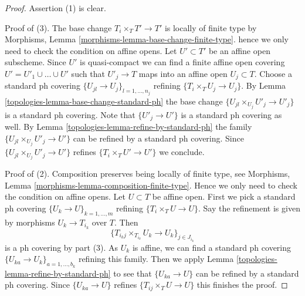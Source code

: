 \begin{proof}

Assertion (1) is clear.

\medskip\noindent
Proof of (3). The base change $T_i \times_T T' \to T'$ is
locally of finite type by
Morphisms, Lemma \ref{morphisms-lemma-base-change-finite-type}.
hence we only need to check the condition on affine opens.
Let $U' \subset T'$ be an affine open subscheme.
Since $U'$ is quasi-compact we can find a finite affine open
covering $U' = U'_1 \cup \ldots \cup U'$ such that
$U'_j \to T$ maps into an affine open $U_j \subset T$.
Choose a standard ph covering $\{U_{jl} \to U_j\}_{l = 1, \ldots, n_j}$
refining $\{T_i \times_T U_j \to U_j\}$.
By Lemma \ref{topologies-lemma-base-change-standard-ph}
the base change $\{U_{jl} \times_{U_j} U'_j \to U'_j\}$
is a standard ph covering. Note that $\{U'_j \to U'\}$
is a standard ph covering as well.
By Lemma \ref{topologies-lemma-refine-by-standard-ph}
the family $\{U_{jl} \times_{U_j} U'_j \to U'\}$
can be refined by a standard ph covering. Since
$\{U_{jl} \times_{U_j} U'_j \to U'\}$ refines $\{T_i \times_T U' \to U'\}$
we conclude.

\medskip\noindent
Proof of (2). Composition preserves being locally of finite type,
see Morphisms, Lemma \ref{morphisms-lemma-composition-finite-type}.
Hence we only need to check the condition on affine opens.
Let $U \subset T$ be affine open. First we pick a standard ph covering
$\{U_k \to U\}_{k = 1, \ldots, m}$ refining
$\{T_i \times_T U \to U\}$.
Say the refinement is given by morphisms $U_k \to T_{i_k}$ over $T$.
Then
$$
\{T_{i_kj} \times_{T_{i_k}} U_k \to U_k\}_{j \in J_{i_k}}
$$
is a ph covering by part (3). As $U_k$ is affine,
we can find a standard ph covering
$\{U_{ka} \to U_k\}_{a = 1, \ldots, b_k}$ refining this family.
Then we apply Lemma \ref{topologies-lemma-refine-by-standard-ph}
to see that $\{U_{ka} \to U\}$ can be refined by a
standard ph covering. Since $\{U_{ka} \to U\}$
refines $\{T_{ij} \times_T U \to U\}$ this finishes the proof.
\end{proof}

